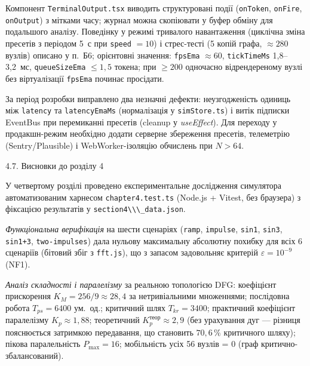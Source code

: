 \documentclass[
]{article}
\newcommand{\passthrough}[1]{#1}
\begin{document}
Компонент \passthrough{\lstinline!TerminalOutput.tsx!} виводить
структуровані події (\passthrough{\lstinline!onToken!},
\passthrough{\lstinline!onFire!}, \passthrough{\lstinline!onOutput!}) з
мітками часу; журнал можна скопіювати у буфер обміну для подальшого
аналізу. Поведінку у режимі тривалого навантаження (циклічна зміна
пресетів з періодом 5~с при \passthrough{\lstinline!speed!} \(= 10\)) і
стрес-тесті (5 копій графа, \(\approx 280\) вузлів) описано у п.~Б6;
орієнтовні значення: \passthrough{\lstinline!fpsEma!} \(\approx 60\),
\passthrough{\lstinline!tickTimeMs!} 1,8--3,2~мс,
\passthrough{\lstinline!queueSizeEma!} \(\leq 1,5\) токена; при
\(\geq 200\) одночасно відрендереному вузлі без віртуалізації
\passthrough{\lstinline!fpsEma!} починає просідати.

За період розробки виправлено два незначні дефекти: неузгодженість
одиниць між \passthrough{\lstinline!latency!} та
\passthrough{\lstinline!latencyEmaMs!} (нормалізація у
\passthrough{\lstinline!simStore.ts!}) і витік підписки EventBus при
перемиканні пресетів (cleanup у \emph{useEffect}). Для переходу у
продакшн-режим необхідно додати серверне збереження пресетів, телеметрію
(Sentry/Plausible) і WebWorker-ізоляцію обчислень при \(N > 64\).

\protect{}\label{Xefd44ea7b278ecae6826470684261cf88301aae}{}4.7.
Висновки до розділу 4

У четвертому розділі проведено експериментальне дослідження симулятора
автоматизованим харнесом \passthrough{\lstinline!chapter4.test.ts!}
(Node.js + Vitest, без браузера) з фіксацією результатів у
\passthrough{\lstinline!section4\\\_!}\passthrough{\lstinline!data.json!}.

\emph{Функціональна верифікація} на шести сценаріях
(\passthrough{\lstinline!ramp!}, \passthrough{\lstinline!impulse!},
\passthrough{\lstinline!sin1!}, \passthrough{\lstinline!sin3!},
\passthrough{\lstinline!sin1+3!},
\passthrough{\lstinline!two-impulses!}) дала нульову максимальну
абсолютну похибку для всіх 6 сценаріїв (бітовий збіг з
\passthrough{\lstinline!fft.js!}), що з запасом задовольняє критерій
\(\varepsilon = 10^{- 9}\) (NF1).

\emph{Аналіз складності і паралелізму} за реальною топологією DFG:
коефіцієнт прискорення \(K_{M} = 256/9 \approx 28,4\) за нетривіальними
множеннями; послідовна робота \(T_{ps} = 6400\) ум.~од.; критичний шлях
\(T_{kr} = 3400\); практичний коефіцієнт паралелізму
\(K_{p} \approx 1,88\); теоретичний \(K_{p}^{\text{теор}} \approx 2,9\)
(без урахування дуг --- різниця пояснюється затримкою передавання, що
становить \(70,6\,\%\) критичного шляху); пікова паралельність
\(P_{\max} = 16\); мобільність усіх 56 вузлів = 0 (граф
критично-збалансований).
\end{document}
